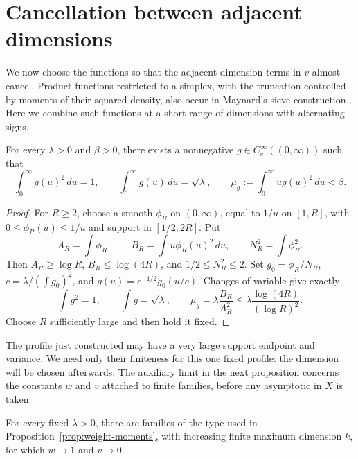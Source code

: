 \section{Cancellation between adjacent dimensions}\label{sec:cancellation}

We now choose the functions so that the adjacent-dimension terms in
$v$ almost cancel.  Product functions restricted to a simplex, with
the truncation controlled by moments of their squared density, also
occur in Maynard's sieve construction \cite[Section~7]{Maynard2015}.
Here we combine such functions at a short range of dimensions with
alternating signs.

\begin{lemma}
\label{lem:small-first-moment}
For every $\lambda>0$ and $\beta>0$, there exists a nonnegative
$g\in C_c^\infty((0,\infty))$ such that
\[
 \int_0^\infty g(u)^2\,du=1,\qquad
 \int_0^\infty g(u)\,du=\sqrt\lambda,\qquad
 \mu_g:=\int_0^\infty u g(u)^2\,du<\beta.
\]
\end{lemma}

\begin{proof}
For $R\ge2$, choose a smooth $\phi_R$ on $(0,\infty)$, equal to $1/u$
on $[1,R]$, with $0\le\phi_R(u)\le1/u$ and support in $[1/2,2R]$.
Put
\[
 A_R=\int\phi_R,\qquad B_R=\int u\phi_R(u)^2\,du,
 \qquad N_R^2=\int\phi_R^2.
\]
Then $A_R\ge\log R$, $B_R\le\log(4R)$, and
$1/2\le N_R^2\le2$.  Set $g_0=\phi_R/N_R$,
$c=\lambda/(\int g_0)^2$, and $g(u)=c^{-1/2}g_0(u/c)$.
Changes of variable give exactly
\[
 \int g^2=1,\qquad \int g=\sqrt\lambda,
 \qquad
 \mu_g=\lambda\frac{B_R}{A_R^2}
       \le\lambda\frac{\log(4R)}{(\log R)^2}.
\]
Choose $R$ sufficiently large and then hold it fixed.
\end{proof}

The profile just constructed may have a very large support endpoint
and variance. We need only their finiteness for this one fixed
profile: the dimension will be chosen afterwards. The auxiliary
limit in the next proposition concerns the constants $w$ and $v$
attached to finite families, before any asymptotic in $X$ is taken.

\begin{proposition}
\label{prop:dimension-cancellation}
For every fixed $\lambda>0$, there are families of the type used in
Proposition~\ref{prop:weight-moments}, with increasing finite maximum
dimension $k$, for which $w\to1$ and $v\to0$.
\end{proposition}

